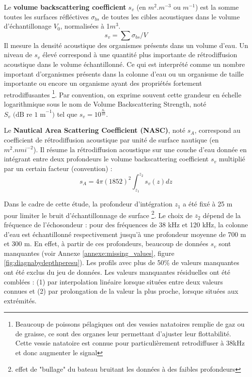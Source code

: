 \documentclass[11pt,a4paper,oneside]{report}
\begin{document}
	\vspace{0.5cm}
	
	Le \textbf{volume backscattering coefficient} $s_v$ (en $m^{2}.m^{-3}$ ou $m^{-1}$) est la somme  toutes les surfaces réfléctives $\sigma_{bs}$ de toutes les cibles acoustiques dans le volume d'échantillonage $V_0$, normalisées à 1$m^{3}$.  
	\begin{equation}
		s_v = \sum \sigma_{bs}/V
	\end{equation}
	Il mesure la densité acoustique des organismes présents dans un volume d'eau. Un niveau de $s_v$ élevé correspond à une quantité plus importante de rétrodiffusion acoustique dans le volume échantillonné. Ce qui est interprété comme un nombre important d'organismes présents dans la colonne d'eau ou un organisme de taille importante ou encore un organisme ayant des propriétés fortement retrodiffusantes \footnote{Beaucoup de poissons pélagiques ont des vessies natatoires remplie de gaz ou de graisse, ce sont des organes leur permettant d'ajuster leur flottabilité. Cette vessie natatoire est connue pour particulièrement retrodiffuser à 38kHz et donc augmenter le signal}. Par convention, on exprime souvent cette grandeur en échelle logarithmique sous le nom de Volume Backscattering Strength, noté $S_v \text{ (dB re 1 m}^{-1})$ tel que $s_v = 10^{\frac {S_v} {10}}$.
	
	\vspace{0.5cm}
	
	Le \textbf{Nautical Area Scattering Coefficient (NASC)}, noté $s_A$, correspond au coefficient de rétrodiffusion acoustique par unité de surface nautique (en $m^{2}.nmi^{-2}$). Il résume la rétrodiffusion acoustique sur une couche d'eau donnée en intégrant entre deux profondeurs le volume backscattering coefficient $s_v$ multiplié par un certain facteur (convention) :
	\begin{equation}
		s_A = 4 \pi (1852)^{2} \int_{z_{1}}^{z_{2}} s_v(z) dz
	\end{equation}
	
	Dans le cadre de cette étude, la profondeur d'intégration $z_1$ a été fixé à 25 m pour limiter le bruit d’échantillonnage de surface \footnote{effet de "bullage" du bateau bruitant les données à des faibles profondeurs}. Le choix de $z_2$ dépend de la fréquence de l'échosondeur : pour des fréquences de 38 kHz et 120 kHz, la colonne d'eau est échantillonné respectivement jusqu'à une profondeur moyenne de 700 m et 300 m. En effet, à partir de ces profondeurs, beaucoup de données $s_v$  sont manquantes (voir Annexe \ref{annexe:missing_values}, figure \ref{fig:diagnabydepthperesu}). Les profils avec plus de 50\% de valeurs manquantes ont été exclus du jeu de données. Les valeurs manquantes résiduelles ont été comblées : (1) par interpolation linéaire lorsque situées entre deux valeurs connues et (2) par prolongation de la valeur la plus proche, lorsque situées aux extrémités. 
	
\end{document}
